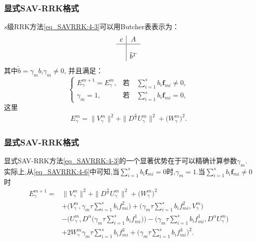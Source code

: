 \documentclass[aspectratio=169]{beamer}
\numberwithin{theorem}{section} %
\begin{document}
\begin{frame}\frametitle{显式SAV-RRK格式}
	$s$级RRK方法\eqref{eq_SAVRRK:4-3}可以用Butcher表表示为：
	\begin{equation}
	\begin{array}{c|c}
	c & A \\
	\hline \\
	& \tilde{b}^T
	\end{array}
	\end{equation}
	其中$\tilde{b}=\gamma_m b$,$\gamma_m\neq 0$, 并且满足：
	\begin{equation}
	\left\{\begin{array}{ll}
	E_{\gamma}^{m+1}=E_{\gamma}^{m}, & \text{若} \quad  \sum\limits_{i=1}^s b_i \bm{f}_{m i} \neq 0,\\
	\gamma_m=1, & \text{若} \quad  \sum\limits_{i=1}^s b_i \bm{f}_{m i} =0,
	\end{array}\right.\label{eq_SAVRRK:4-6}
	\end{equation}
	这里
	\begin{align}\label{eq_SAVRRK:4-6b}
	E_{\gamma}^{m}  =\|V_{\gamma}^{m}\|^2+\|D^\frac{\alpha}{2} U_{\gamma}^{m}\|^2+\big(W_{\gamma}^{m}\big)^2.
	\end{align}
	
\end{frame}

\begin{frame}\frametitle{显式SAV-RRK格式}

	显式SAV-RRK方法\eqref{eq_SAVRRK:4-3}的一个显著优势在于可以精确计算参数$\gamma_m$.
	实际上,从\eqref{eq_SAVRRK:4-6}中可知,当$\sum\limits_{i=1}^s b_i \bm{f}_{m i}=0$时,$\gamma_m=1$.当$\sum\limits_{i=1}^s b_i \bm{f}_{m i}\neq 0$时%
	\begin{align}
	E_{\gamma}^{m+1}  = & \|V_{\gamma}^{m}\|^2+\|D^\frac{\alpha}{2} U_{\gamma}^{m}\|^2+\big(W_{\gamma}^{m}\big)^2 \nonumber\\
	& + \big(V_{\gamma}^{m},\gamma_m\tau\sum\limits_{i=1}^{s}b_if_{mi}^2\big)+\big(\gamma_m\tau\sum\limits_{i=1}^{s}b_if_{mi}^2,V_{\gamma}^{m}\big)\nonumber\\
	&-\big(U_{\gamma}^{m}, D^{\alpha}\big(\gamma_m\tau\sum\limits_{i=1}^{s}b_if_{mi}^1\big)\big)-\big(\gamma_m\tau\sum\limits_{i=1}^{s}b_if_{mi}^1, D^{\alpha} U_{\gamma}^{m}\big)\nonumber\\
	&+2W_{\gamma}^{m}\gamma_m\tau\sum\limits_{i=1}^{s}b_if_{mi}^3+\big(\gamma_m\tau\sum\limits_{i=1}^{s}b_if_{mi}^3\big)^2.\label{eq_SAVRRK:49}
	\end{align}
		
\end{frame}
\end{document}
